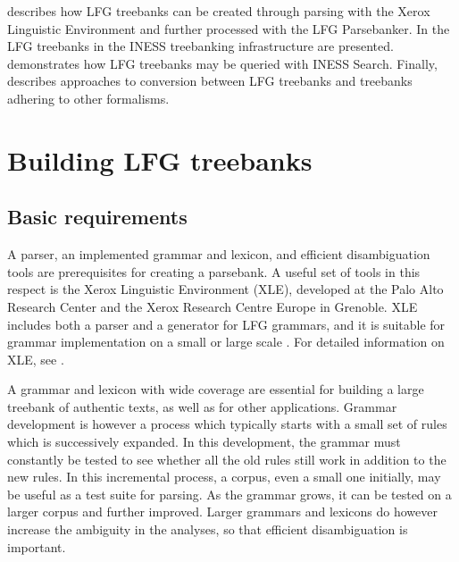 \documentclass[output=paper,hidelinks]{langscibook}
\begin{document}
 describes how LFG treebanks can be created through parsing with the Xerox Linguistic Environment and further processed with the LFG Parsebanker.
In  the LFG treebanks in the INESS treebanking infrastructure are presented.
 demonstrates how LFG treebanks may be queried with INESS Search.
Finally,   describes approaches to conversion between LFG treebanks and treebanks adhering to other formalisms. 


\section{Building LFG treebanks}\label{building}

\subsection{Basic requirements}

A parser, an implemented grammar and lexicon, and efficient disambiguation tools are prerequisites for creating a parsebank.
A useful set of tools in this respect is the Xerox Linguistic Environment (XLE), developed at the Palo Alto Research Center and the Xerox Research Centre Europe in Grenoble. %
XLE includes both a parser and a generator for LFG grammars, and it is suitable for grammar implementation on a small or large scale \citep{xledoc,maxwellkaplan93}.
For detailed information on XLE, see .

A grammar and lexicon with wide coverage are essential for building a large treebank of authentic texts, as well as for other applications.
Grammar development is however a process which typically starts with a small set of rules which is successively expanded.
In this development, the grammar must constantly be tested to see whether all the old rules still work in addition to the new rules.
In this incremental process, a corpus, even a small one initially, may be useful as a test suite for parsing.
As the grammar grows, it can be tested on a larger corpus and further improved.
Larger grammars and lexicons do however increase the ambiguity in the analyses, so that efficient disambiguation is important.
\end{document}

